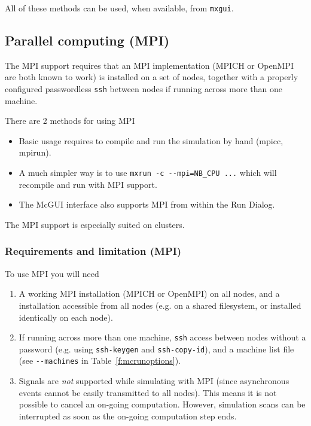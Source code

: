 All of these methods can be used, when available, from \texttt{mxgui}.

\subsection{Parallel computing (MPI)}

\label{s:mpi}
The MPI support requires that an MPI implementation (MPICH or OpenMPI are
both known to work) is installed on a set of nodes, together with a
properly configured passwordless \texttt{ssh} between nodes if running
across more than one machine.

There are 2 methods for using MPI
\begin{itemize}
\item Basic usage requires to compile and run the simulation by hand (mpicc, mpirun).
\item A much simpler way is to use \verb+mxrun -c --mpi=NB_CPU ...+ which will
  recompile and run with MPI support.
\item The McGUI interface also supports MPI from within the Run Dialog.
\end{itemize}

The MPI support is especially suited on clusters.

\subsubsection{Requirements and limitation (MPI)}

To use MPI you will need
  \begin{enumerate}
  \item{A working MPI installation (MPICH or OpenMPI) on all nodes, and a \MCX
      installation accessible from all nodes (e.g. on a shared filesystem, or
      installed identically on each node).}
  \item{If running across more than one machine, \texttt{ssh} access between
      nodes without a password (e.g. using \texttt{ssh-keygen} and
      \texttt{ssh-copy-id}), and a machine list file (see \verb+--machines+ in
      Table~\ref{f:mcrunoptions}).}
  \item Signals are \emph{not} supported while simulating with MPI (since
    asynchronous events cannot be easily transmitted to all nodes). This
    means it is not possible to cancel an on-going computation. However,
    simulation scans can be interrupted as soon as the on-going computation
    step ends.
  \end{enumerate}

